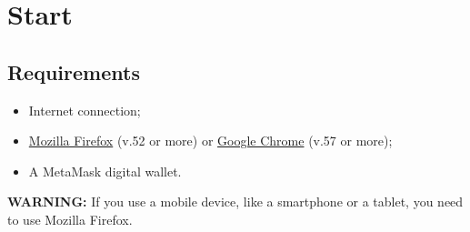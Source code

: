 \documentclass[ManualeUtente]{subfiles}
\begin{document}
\chapter{Start}

\section{Requirements}
\begin{itemize}
	\item Internet connection;
	\item \href{https://www.mozilla.org/en-US/firefox/new/}{Mozilla Firefox} (v.52 or more) or	
	\href{https://www.google.com/intl/en/chrome/}{Google Chrome} (v.57 or more);
	\item A MetaMask digital wallet.
\end{itemize}

\textbf{WARNING:} If you use a mobile device, like a smartphone or a tablet, you need to use Mozilla Firefox.
\end{document}
